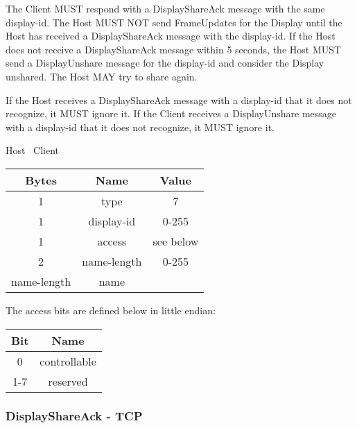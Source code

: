 The Client MUST respond with a DisplayShareAck message with the same display-id.
The Host MUST NOT send FrameUpdates for the Display until the Host has received a DisplayShareAck message with the display-id.
If the Host does not receive a DisplayShareAck message within 5 seconds, the Host MUST send a DisplayUnshare message
for the display-id and consider the Display unshared.
The Host MAY try to share again.

If the Host receives a DisplayShareAck message with a display-id that it does not recognize, it MUST ignore it.
If the Client receives a DisplayUnshare message with a display-id that it does not recognize, it MUST ignore it.

\begin{center}
    Host \textrightarrow\ Client\\
    \begin{tabular}{|c|c|c|}
        \hline
        \textbf{Bytes} & \textbf{Name} & \textbf{Value} \\
        \hline
        1              & type          & 7              \\
        \hline
        1              & display-id    & 0-255          \\
        \hline
        1              & access        & see below      \\
        \hline
        2              & name-length   & 0-255          \\
        \hline
        name-length    & name          &                \\
        \hline
    \end{tabular}
\end{center}

The access bits are defined below in little endian:

\begin{center}
    \begin{tabular}{|c|c|}
        \hline
        \textbf{Bit} & \textbf{Name} \\
        \hline
        0            & controllable  \\
        \hline
        1-7          & reserved      \\
        \hline
    \end{tabular}
\end{center}

\subsubsection{DisplayShareAck - TCP}

